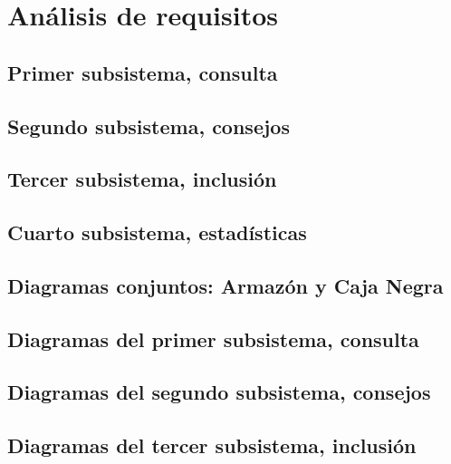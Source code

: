 \documentclass[a4paper, 11pt]{article}
\begin{document}
\newpage
\section{Análisis de requisitos}

\subsection{Primer subsistema, consulta}


\subsection{Segundo subsistema, consejos}


\subsection{Tercer subsistema, inclusión}


\subsection{Cuarto subsistema, estadísticas}


\newpage

\subsection{Diagramas conjuntos: Armazón y Caja Negra}


\newpage
\subsection{Diagramas del primer subsistema, consulta}


\newpage
\subsection{Diagramas del segundo subsistema, consejos}


\newpage

\subsection{Diagramas del tercer subsistema, inclusión}

\end{document}
